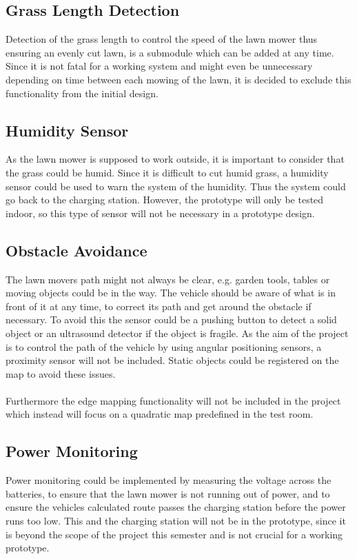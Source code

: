 
\subsection{Grass Length Detection}
Detection of the grass length to control the speed of the lawn mower thus ensuring an evenly cut lawn, is a submodule which can be added at any time. Since it is not fatal for a working system and might even be unnecessary depending on time between each mowing of the lawn, it is decided to exclude this functionality from the initial design.

\subsection{Humidity Sensor}
As the lawn mower is supposed to work outside, it is important to consider that the grass could be humid. Since it is difficult to cut humid grass, a humidity sensor could be used to warn the system of the humidity. Thus the system could go back to the charging station. However, the prototype will only be tested indoor, so this type of sensor will not be necessary in a prototype design.

\subsection{Obstacle Avoidance}
The lawn movers path might not always be clear, e.g. garden tools, tables or moving objects could be in the way. The vehicle should be aware of what is in front of it at any time, to correct its path and get around the obstacle if necessary. To avoid this the sensor could be a pushing button to detect a solid object or an ultrasound detector if the object is fragile.
As the aim of the project is to control the path of the vehicle by using angular positioning sensors, a proximity sensor will not be included. Static objects could be registered on the map to avoid these issues.\\\\
Furthermore the edge mapping functionality will not be included in the project which instead will focus on a quadratic map predefined in the test room.

\subsection{Power Monitoring}
Power monitoring could be implemented by measuring the voltage across the batteries, to ensure that the lawn mower is not running out of power, and to ensure the vehicles calculated route passes the charging station before the power runs too low.
This and the charging station will not be in the prototype, since it is beyond the scope of the project this semester and is not crucial for a working prototype.
